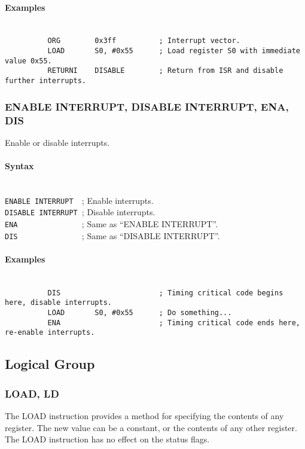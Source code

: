             \paragraph{Examples}
                ~\\
                \verb'          ORG        0x3ff          ; Interrupt vector.'\\
                \verb'          LOAD       S0, #0x55      ; Load register S0 with immediate value 0x55.'\\
                \verb'          RETURNI    DISABLE        ; Return from ISR and disable further interrupts.'

        \subsubsection{ENABLE INTERRUPT, DISABLE INTERRUPT, ENA, DIS}
            Enable or disable interrupts.

            \paragraph{Syntax}
                ~\\
                \verb'ENABLE INTERRUPT  '; Enable interrupts.\\
                \verb'DISABLE INTERRUPT '; Disable interrupts.\\
                \verb'ENA               '; Same as ``ENABLE INTERRUPT''.\\
                \verb'DIS               '; Same as ``DISABLE INTERRUPT''.

            \paragraph{Examples}
                ~\\
                \verb'          DIS                       ; Timing critical code begins here, disable interrupts.'\\
                \verb'          LOAD       S0, #0x55      ; Do something...'\\
                \verb'          ENA                       ; Timing critical code ends here, re-enable interrupts.'

    \subsection{Logical Group}
        \subsubsection{LOAD, LD}
            The LOAD instruction provides a method for specifying the contents of any register. The new value can be a constant, or the contents of any other register. The LOAD instruction has no effect on the status flags.

